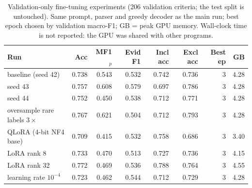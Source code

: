 \begin{table}[t]
\centering
\footnotesize
\caption{Validation-only fine-tuning experiments (206 validation criteria; the test split is untouched). Same prompt, parser and greedy decoder as the main run; best epoch chosen by validation macro-F1; GB = peak GPU memory. Wall-clock time is not reported: the GPU was shared with other programs.}
\label{tab:exps}
\begin{tabular}{lrrrrrrr}
\toprule
Run & Acc & MF1$_p$ & Evid F1 & Incl acc & Excl acc & Best ep & GB \\
\midrule
baseline (seed 42) & 0.738 & 0.543 & 0.532 & 0.742 & 0.736 & 3 & 4.28 \\
seed 43 & 0.757 & 0.608 & 0.579 & 0.697 & 0.786 & 3 & 4.28 \\
seed 44 & 0.752 & 0.450 & 0.538 & 0.712 & 0.771 & 3 & 4.28 \\
oversample rare labels $3\times$ & 0.767 & 0.621 & 0.504 & 0.712 & 0.793 & 3 & 4.28 \\
QLoRA (4-bit NF4 base) & 0.709 & 0.415 & 0.532 & 0.758 & 0.686 & 3 & 3.40 \\
LoRA rank 8 & 0.733 & 0.470 & 0.513 & 0.727 & 0.736 & 3 & 4.15 \\
LoRA rank 32 & 0.772 & 0.469 & 0.536 & 0.788 & 0.764 & 3 & 4.55 \\
learning rate $10^{-4}$ & 0.723 & 0.462 & 0.544 & 0.712 & 0.729 & 3 & 4.28 \\
\bottomrule
\end{tabular}
\end{table}
